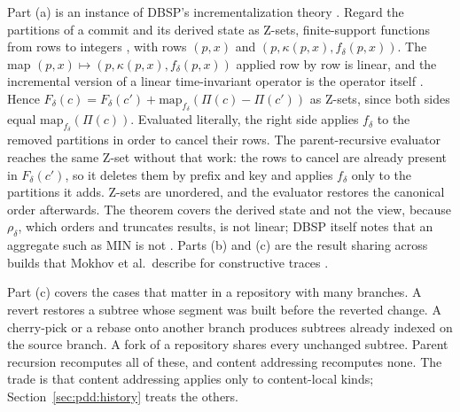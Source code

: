 \documentclass[11pt,letterpaper]{article}
\theoremstyle{definition}
\theoremstyle{remark}
\begin{document}
Part (a) is an instance of DBSP's incrementalization theory \cite{budiu2023dbsp}. Regard the partitions of a commit and its derived state as Z-sets, finite-support functions from rows to integers \cite[Section~4.1]{budiu2023dbsp}, with rows $(p,x)$ and $(p,\kappa(p,x),f_\delta(p,x))$. The map $(p,x)\mapsto(p,\kappa(p,x),f_\delta(p,x))$ applied row by row is linear, and the incremental version of a linear time-invariant operator is the operator itself \cite[Theorem~3.3]{budiu2023dbsp}. Hence $F_\delta(c)=F_\delta(c')+\mathrm{map}_{f_\delta}(\Pi(c)-\Pi(c'))$ as Z-sets, since both sides equal $\mathrm{map}_{f_\delta}(\Pi(c))$. Evaluated literally, the right side applies $f_\delta$ to the removed partitions in order to cancel their rows. The parent-recursive evaluator reaches the same Z-set without that work: the rows to cancel are already present in $F_\delta(c')$, so it deletes them by prefix and key and applies $f_\delta$ only to the partitions it adds. Z-sets are unordered, and the evaluator restores the canonical order afterwards. The theorem covers the derived state and not the view, because $\rho_\delta$, which orders and truncates results, is not linear; DBSP itself notes that an aggregate such as MIN is not \cite[Section~7]{budiu2023dbsp}. Parts (b) and (c) are the result sharing across builds that Mokhov et al.\ describe for constructive traces \cite[Section~4.2.3]{mokhov2018build}.

Part (c) covers the cases that matter in a repository with many branches. A revert restores a subtree whose segment was built before the reverted change. A cherry-pick or a rebase onto another branch produces subtrees already indexed on the source branch. A fork of a repository shares every unchanged subtree. Parent recursion recomputes all of these, and content addressing recomputes none. The trade is that content addressing applies only to content-local kinds; Section~\ref{sec:pdd:history} treats the others.
\end{document}
